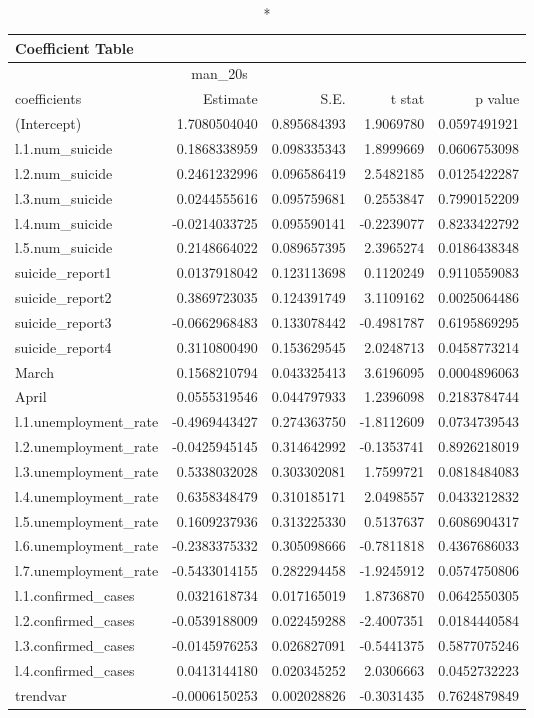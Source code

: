 \begin{longtable}{lrrrr}
\caption*{
{\large Coefficient Table}
} \\ 
\toprule
\multicolumn{4}{c}{man\_20s} &  \\ 
\cmidrule(lr){1-4}
coefficients & Estimate & S.E. & t stat & p value \\ 
\midrule\addlinespace[2.5pt]
(Intercept) & 1.7080504040 & 0.895684393 & 1.9069780 & 0.0597491921 \\ 
l.1.num\_suicide & 0.1868338959 & 0.098335343 & 1.8999669 & 0.0606753098 \\ 
l.2.num\_suicide & 0.2461232996 & 0.096586419 & 2.5482185 & 0.0125422287 \\ 
l.3.num\_suicide & 0.0244555616 & 0.095759681 & 0.2553847 & 0.7990152209 \\ 
l.4.num\_suicide & -0.0214033725 & 0.095590141 & -0.2239077 & 0.8233422792 \\ 
l.5.num\_suicide & 0.2148664022 & 0.089657395 & 2.3965274 & 0.0186438348 \\ 
suicide\_report1 & 0.0137918042 & 0.123113698 & 0.1120249 & 0.9110559083 \\ 
suicide\_report2 & 0.3869723035 & 0.124391749 & 3.1109162 & 0.0025064486 \\ 
suicide\_report3 & -0.0662968483 & 0.133078442 & -0.4981787 & 0.6195869295 \\ 
suicide\_report4 & 0.3110800490 & 0.153629545 & 2.0248713 & 0.0458773214 \\ 
March & 0.1568210794 & 0.043325413 & 3.6196095 & 0.0004896063 \\ 
April & 0.0555319546 & 0.044797933 & 1.2396098 & 0.2183784744 \\ 
l.1.unemployment\_rate & -0.4969443427 & 0.274363750 & -1.8112609 & 0.0734739543 \\ 
l.2.unemployment\_rate & -0.0425945145 & 0.314642992 & -0.1353741 & 0.8926218019 \\ 
l.3.unemployment\_rate & 0.5338032028 & 0.303302081 & 1.7599721 & 0.0818484083 \\ 
l.4.unemployment\_rate & 0.6358348479 & 0.310185171 & 2.0498557 & 0.0433212832 \\ 
l.5.unemployment\_rate & 0.1609237936 & 0.313225330 & 0.5137637 & 0.6086904317 \\ 
l.6.unemployment\_rate & -0.2383375332 & 0.305098666 & -0.7811818 & 0.4367686033 \\ 
l.7.unemployment\_rate & -0.5433014155 & 0.282294458 & -1.9245912 & 0.0574750806 \\ 
l.1.confirmed\_cases & 0.0321618734 & 0.017165019 & 1.8736870 & 0.0642550305 \\ 
l.2.confirmed\_cases & -0.0539188009 & 0.022459288 & -2.4007351 & 0.0184440584 \\ 
l.3.confirmed\_cases & -0.0145976253 & 0.026827091 & -0.5441375 & 0.5877075246 \\ 
l.4.confirmed\_cases & 0.0413144180 & 0.020345252 & 2.0306663 & 0.0452732223 \\ 
trendvar & -0.0006150253 & 0.002028826 & -0.3031435 & 0.7624879849 \\ 
\bottomrule
\end{longtable}

